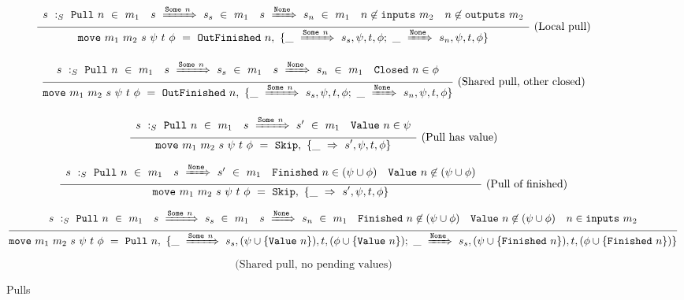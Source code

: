 \begin{figure*}


$$
\ruleI
{
    \arrLCCCR
        { \CheckStateTypeM{m_1}{s}{\Pull{n}} }
        { \TransM{s}{\Some{n}}{s_s}{m_1} }
        { \TransM{s}{\None}{s_n}{m_1} }
        { n \not\in \inputs{m_2} }
        { n \not\in \outputs{m_2} }
}
{
    \MoveOut
        {\sptp}
        {\OutFinished{n}}
        { \MoveT{\Some{n}}{s_s, \psi, t, \phi}
         ;~
          \MoveT{\None}{s_n, \psi, t, \phi} }
}
\textrm{(Local pull)}
$$

$$
\ruleI
{
    \arrLCCR
        { \CheckStateTypeM{m_1}{s}{\Pull{n}} }
        { \TransM{s}{\Some{n}}{s_s}{m_1} }
        { \TransM{s}{\None}{s_n}{m_1} }
        { \Closed{n} \in \phi }
}
{
    \MoveOut
        {\sptp}
        {\OutFinished{n}}
        { \MoveT{\Some{n}}{s_s, \psi, t, \phi}
         ;~
          \MoveT{\None}{s_n, \psi, t, \phi} }
}
\textrm{(Shared pull, other closed)}
$$


$$
\ruleI
{
    \arrLCR
        { \CheckStateTypeM{m_1}{s}{\Pull{n}} }
        { \TransM{s}{\Some{n}}{s'}{m_1} }
        { \Value{n} \in \psi }
}
{
    \MoveOut
        {\sptp}
        {\Skip}
        { \MoveTU{\sPptpC} }
}
\textrm{(Pull has value)}
$$

$$
\ruleI
{
    \arrLCCR
        { \CheckStateTypeM{m_1}{s}{\Pull{n}} }
        { \TransM{s}{\None}{s'}{m_1} }
        { \Finished{n} \in (\psi \cup \phi) }
        { \Value{n} \not\in (\psi \cup \phi) }
}
{
    \MoveOut
        {\sptp}
        {\Skip}
        { \MoveTU{\sPptpC} }
}
\textrm{(Pull of finished)}
$$

$$
\ruleI
{
        \CheckStateTypeM{m_1}{s}{\Pull{n}}
        \quad
        \TransM{s}{\Some{n}}{s_s}{m_1}
        \quad
        \TransM{s}{\None}{s_n}{m_1}
        \quad
        \Finished{n} \not\in (\psi \cup \phi)
        \quad
        \Value{n} \not\in (\psi \cup \phi)
        \quad
        n \in \inputs{m_2}
}
{
    \MoveOut
        {\sptp}
        {\Pull{n}}
        { \MoveT{\Some{n}}{s_s, (\psi \cup \{ \Value{n} \}), t, (\phi \cup \{ \Value{n} \}) }
         ;~
          \MoveT{\None}{s_s, (\psi \cup \{ \Finished{n} \}), t, (\phi \cup \{ \Finished{n} \}) }
         }
}
$$
$$\textrm{(Shared pull, no pending values)}$$

\caption{Pulls}
\label{fig:merge:gen:pull}
\end{figure*}

